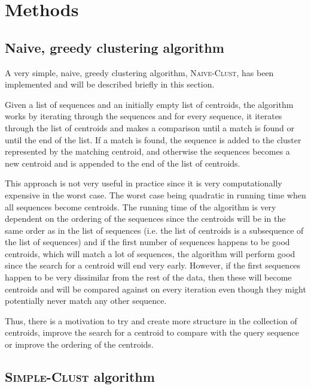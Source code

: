 \section{Methods} \label{sec:methods}





\subsection{Naive, greedy clustering algorithm}

A very simple, naive, greedy clustering algorithm, \textsc{Naive-Clust}, has
been implemented and will be described briefly in this section.

Given a list of sequences and an initially empty list of centroids, the
algorithm works by iterating through the sequences and for every sequence, it
iterates through the list of centroids and makes a comparison until a match is
found or until the end of the list. If a match is found, the sequence is
added to the cluster represented by the matching centroid, and otherwise the
sequences becomes a new centroid and is appended to the end of the list of
centroids.

This approach is not very useful in practice since it is very computationally
expensive in the worst case. The worst case being quadratic in running time
when all sequences become centroids. The running time of the algorithm is very
dependent on the ordering of the sequences since the centroids will be in the
same order as in the list of sequences (i.e. the list of centroids is a
subsequence of the list of sequences) and if the first number of sequences
happens to be good centroids, which will match a lot of sequences, the
algorithm will perform good since the search for a centroid will end very
early. However, if the first sequences happen to be very dissimilar from the
rest of the data, then these will become centroids and will be compared
against on every iteration even though they might potentially never match any
other sequence.

Thus, there is a motivation to try and create more structure in the collection
of centroids, improve the search for a centroid to compare with the query
sequence or improve the ordering of the centroids.


\subsection{\textsc{Simple-Clust} algorithm}

